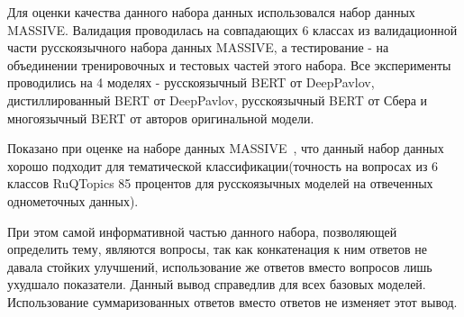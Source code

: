\begin{table}
\centering
{}
\caption{Размеры набора данных {RuQTopics} по классу и части}
\label{tab:RuQTopics:sizes}
\end{table}

Для оценки качества данного набора данных использовался набор данных MASSIVE. Валидация проводилась на совпадающих 6 классах из валидационной части русскоязычного набора данных MASSIVE, а тестирование - на объединении тренировочных и тестовых частей этого набора. Все эксперименты проводились на 4 моделях - русскоязычный BERT от DeepPavlov, дистиллированный BERT от DeepPavlov, русскоязычный BERT от Сбера и многоязычный BERT от авторов оригинальной модели.

Показано при оценке на наборе данных MASSIVE~\cite{massive}, что данный набор данных хорошо подходит для тематической классификации(точность на вопросах из 6 классов {RuQTopics} 85 процентов для русскоязычных моделей на отвеченных однометочных данных). 

При этом самой информативной частью данного набора, позволяющей определить тему, являются вопросы, так как конкатенация к ним ответов не давала стойких улучшений, использование же ответов вместо вопросов лишь ухудшало показатели. Данный вывод справедлив для всех базовых моделей. Использование суммаризованных ответов вместо ответов не изменяет этот вывод.

